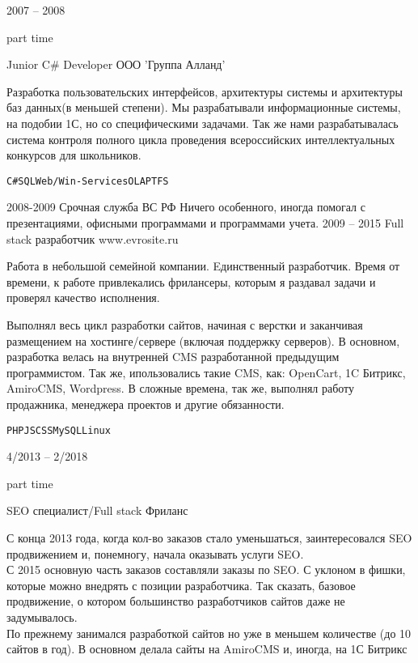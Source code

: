 \documentclass[10pt]{tpl/developercv} %
\begin{document}


\begin{entrylist}
	\entry
		{2007 -- 2008

		\footnotesize{part time}}
		{Junior C\# Developer}
		{ООО 'Группа Алланд'}
		{Разработка пользовательских интерфейсов, архитектуры системы и архитектуры баз данных(в меньшей степени). Мы разрабатывали информационные системы, на подобии 1С, но со специфическими задачами. Так же нами разрабатывалась система контроля полного цикла проведения всероссийских интеллектуальных конкурсов для школьников.

		\texttt{C\#}\slashsep\texttt{SQL}\slashsep\texttt{Web/Win-Services}\slashsep\texttt{OLAP}\slashsep\texttt{TFS}}
	\entry
		{2008-2009}
		{Срочная служба}
		{ВС РФ}
		{Ничего особенного, иногда помогал с презентациями, офисными программами и программами учета.}
	\entry
		{2009 -- 2015}
		{Full stack разработчик}
		{www.evrosite.ru}
		{Работа в небольшой семейной компании. Eдинственный разработчик. Время от времени, к работе привлекались фрилансеры, которым я раздавал задачи и проверял качество исполнения.

		Выполнял весь цикл разработки сайтов, начиная с верстки и заканчивая размещением на хостинге/сервере (включая поддержку серверов). В основном, разработка велась на внутренней CMS разработанной предыдущим программистом. Так же, ипользовались такие CMS, как: OpenCart, 1C Битрикс, AmiroCMS, Wordpress. В сложные времена, так же, выполнял работу продажника, менеджера проектов и другие обязанности.

		\texttt{PHP}\slashsep\texttt{JS}\slashsep\texttt{CSS}\slashsep\texttt{MySQL}\slashsep\texttt{Linux}}

	\entry
		{4/2013 -- 2/2018

		\footnotesize{part time}}
		{SEO специалист/Full stack}
		{Фриланс}
		{С конца 2013 года, когда кол-во заказов стало уменьшаться, заинтересовался SEO продвижением и, понемногу, начала оказывать услуги SEO.\\
		С 2015 основную часть заказов составляли заказы по SEO. С уклоном в фишки, которые можно внедрять с позиции разработчика. Так сказать, базовое продвижение, о котором большинство разработчиков сайтов даже не задумывалось.\\
		По прежнему занимался разработкой сайтов но уже в меньшем количестве (до 10 сайтов в год). В основном делала сайты на AmiroCMS и, иногда, на 1С Битрикс

}
\end{entrylist}
\end{document}
